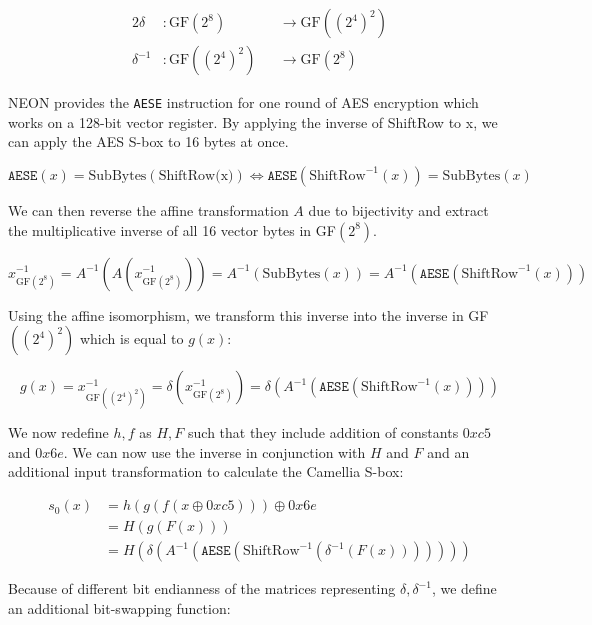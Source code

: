 \begin{alignat*}{2}
    \delta&:\text{GF}(2^8)&&\rightarrow\text{GF}((2^4)^2) \\
    \delta^{-1}&:\text{GF}((2^4)^2)&&\rightarrow\text{GF}(2^8)
\end{alignat*}

NEON provides the \texttt{AESE} instruction for one round of AES encryption
which works on a 128-bit vector register. By applying the inverse of ShiftRow
to x, we can apply the AES S-box to 16 bytes at once.

\[
    \texttt{AESE}(x)=\text{SubBytes}(\text{ShiftRow(x)})\Leftrightarrow \texttt{AESE}(\text{ShiftRow}^{-1}(x))=\text{SubBytes}(x)
\]

We can then reverse the affine transformation $A$ due to bijectivity and
extract the multiplicative inverse of all 16 vector bytes in GF$(2^8)$.

\[
    x^{-1}_{\text{GF}(2^8)}=A^{-1}(A(x^{-1}_{\text{GF}(2^8)}))=A^{-1}(\text{SubBytes}(x))=A^{-1}(\texttt{AESE}(\text{ShiftRow}^{-1}(x)))
\]

Using the affine isomorphism, we transform this inverse into the inverse in
GF$((2^4)^2)$ which is equal to $g(x)$:

\[
    g(x)=x^{-1}_{\text{GF}((2^4)^2)}=\delta(x^{-1}_{\text{GF}(2^8)})=\delta(A^{-1}(\texttt{AESE}(\text{ShiftRow}^{-1}(x))))
\]

We now redefine $h,f$ as $H,F$ such that they include addition of constants
$0xc5$ and $0x6e$. We can now use the inverse in conjunction with $H$ and $F$
and an additional input transformation to calculate the Camellia S-box:

\begin{align*}
    s_0(x)&=h(g(f(x\oplus 0xc5)))\oplus 0x6e \\
          &=H(g(F(x))) \\
          &=H(\delta(A^{-1}(\texttt{AESE}(\text{ShiftRow}^{-1}(\delta^{-1}(F(x)))))))
\end{align*}

Because of different bit endianness of the matrices representing
$\delta,\delta^{-1}$, we define an additional bit-swapping function:

